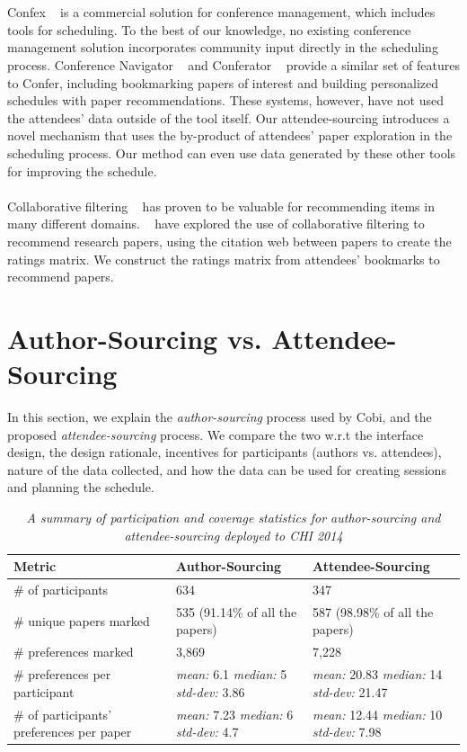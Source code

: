 \documentclass[letterpaper]{article}
\begin{document}
\\
\\
Confex ~\cite{Confex} is a commercial solution for conference management, which includes tools for scheduling. To the best of our knowledge, no existing conference management solution incorporates community input directly in the scheduling process. Conference Navigator ~\cite{ConferenceNavigator} and Conferator ~\cite{ConferenceAnatomy} provide a similar set of features to Confer, including bookmarking papers of interest and building personalized schedules with paper recommendations. These systems, however, have not used the attendees' data outside of the tool itself. Our attendee-sourcing introduces a novel mechanism that uses the by-product of attendees' paper exploration in the scheduling process. Our method can even use data generated by these other tools for improving the schedule.
\\
\\
Collaborative filtering ~\cite{CollaborativeFiltering} has proven to be valuable for recommending items in many different domains. ~\cite{CitationRecommendation} have explored the use of collaborative filtering to recommend research papers, using the citation web between papers to create the ratings matrix. We construct the ratings matrix from attendees' bookmarks to recommend papers.

\section{Author-Sourcing vs. Attendee-Sourcing}
In this section, we explain the \emph{author-sourcing} process used by Cobi, and the proposed \emph{attendee-sourcing} process. We compare the two w.r.t the interface design, the design rationale, incentives for participants (authors vs. attendees), nature of the data collected, and how the data can be used for creating sessions and planning the schedule.
\begin{table}[t]
  \centering
\begin{tabular}{ | p{5.5cm} || p{5cm} | p{5.5cm} | }
\hline
\textbf{Metric} & \textbf{Author-Sourcing} & \textbf{Attendee-Sourcing} \\ \hline
\hline
\# of participants & 634 & 347 \\ 
\hline
\# unique papers marked & 535 (91.14\% of all the papers) & 587 (98.98\% of all the papers) \\ 
\hline
\# preferences marked & 3,869 & 7,228 \\
\hline
\# preferences per participant & \emph{mean:} 6.1 \emph{median:} 5 \emph{std-dev:} 3.86  & \emph{mean:} 20.83 \emph{median:} 14 \emph{std-dev:} 21.47 \\
\hline
\# of participants' preferences per paper & \emph{mean:} 7.23 \emph{median:} 6 \emph{std-dev:} 4.7  & \emph{mean:} 12.44 \emph{median:} 10 \emph{std-dev:} 7.98 \\
\hline
\end{tabular}
\caption{\emph{A summary of participation and coverage statistics for author-sourcing and attendee-sourcing deployed to CHI 2014}}
\end{table}
\end{document}
